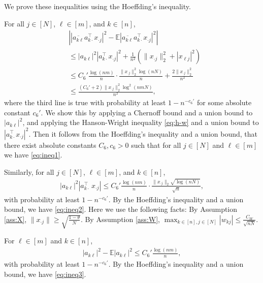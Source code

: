 \documentclass[11pt,journal]{IEEEtran}
\newcommand{\bbE}{\mathbb{E}}
\newcommand{\norm}[1]{\|{#1}\|}
\newcommand{\T}{\top}
\begin{document}
\begin{IEEEproof}
We prove these inequalities using the Hoeffding's inequality.

For all $j\in[N]$, $\ell\in[m]$, and $k\in[n]$,
\begin{align*}
& \left| |\overline{a_{k\ell}}a_{k\cdot}^\T x_{\cdot j}|^2 - \bbE |\overline{a_{k\ell}}a_{k\cdot}^\T x_{\cdot j}|^2 \right| \\
& \leq |a_{k\ell}|^2 |a_{k\cdot}^\T x_{\cdot j}|^2 + \frac{1}{n^2} (\norm{x_{\cdot j}}_2^2 + |x_{\ell j}|^2) \\
& \leq C_6' \frac{\log (nm)}{n} \cdot \frac{\norm{x_{\cdot j}}_2^2\log (nN)}{n} + \frac{2\norm{x_{\cdot j}}_2^2}{n^2} \\
& \leq \frac{(C_6'+2) \norm{x_{\cdot j}}_2^2 \log^2 (nmN)}{n^2} ,
\end{align*}
where the third line is true with probability at least $1-n^{-c_6'}$ for some absolute constant $c_6'$. We show this by applying a Chernoff bound and a union bound to $|a_{k\ell}|^2$, and applying the Hanson-Wright inequality \eqref{eq:h-w} and a union bound to $|a_{k\cdot}^\T x_{\cdot j}|^2$. 
Then it follows from the Hoeffding's inequality and a union bound, that there exist absolute constants $C_6, c_6>0$ such that for all $j\in[N]$ and $\ell\in[m]$ we have \eqref{eq:ineq1}.

Similarly, for all $j\in[N]$, $\ell\in[m]$, and $k\in[n]$,
\begin{align*}
|a_{k\ell}|^2 |a_{k\cdot}^\T\, x_{\cdot j}| \leq C_6' \frac{\log (nm)}{n} \cdot \frac{\norm{x_{\cdot j}}_2\sqrt{\log (nN)} }{\sqrt{n}},
\end{align*}
with probability at least $1-n^{-c_6'}$. By the Hoeffding's inequality and a union bound, we have \eqref{eq:ineq2}. Here we use the following facts: By Assumption \ref{ass:X}, $\norm{x_{\cdot j}}\geq \sqrt{\frac{1-\theta}{N}}$. By Assumption \ref{ass:W}, $\max_{k\in[n],j\in[N]} |w_{kj}| \leq \frac{C_W}{\sqrt{nN}}$.

For $\ell\in[m]$ and $k\in[n]$,
\begin{align*}
|a_{k\ell}|^2 - \bbE |a_{k\ell}|^2 \leq C_6' \frac{\log (nm)}{n},
\end{align*}
with probability at least $1-n^{-c_6'}$. By the Hoeffding's inequality and a union bound, we have \eqref{eq:ineq3}.
\end{IEEEproof}



%
%

\end{document}
